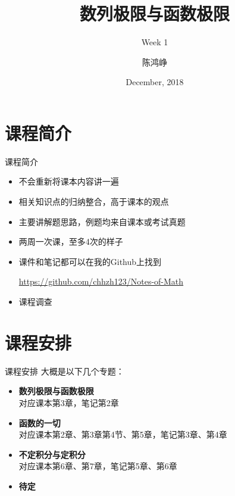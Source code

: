 \documentclass[UTF8]{ctexbeamer}
\title{数列极限与函数极限}
\subtitle{Week 1}
\author[chhzh123]{陈鸿峥}
\institute[]{\small\url{https://github.com/chhzh123/Notes-of-Math/blob/master/Mathematical_analysis/main.pdf}}
\date[Dec 1, 2018]{December, 2018}
\begin{document}
\begin{frame}
\titlepage
\end{frame}

\begin{frame}
\tableofcontents[subsectionstyle=show]
\end{frame}

\section{课程简介}
\begin{frame}
\sectionpage
\end{frame}

\begin{frame}{课程简介}
\begin{itemize}
	\item<1-> 不会重新将课本内容讲一遍
	\item<2-> 相关知识点的归纳整合，高于课本的观点
	\item<3-> 主要讲解题思路，例题均来自课本或考试真题
	\item<4-> 两周一次课，至多4次的样子
	\item<5-> 课件和笔记都可以在我的Github上找到
	\begin{center}
	\url{https://github.com/chhzh123/Notes-of-Math}
	\end{center}
	\item<6> 课程调查
\end{itemize}
\end{frame}

\section{课程安排}
\begin{frame}
\sectionpage
\end{frame}

\begin{frame}{课程安排}
大概是以下几个专题：
\begin{itemize}
	\item \textbf{数列极限与函数极限}\\
	对应课本第3章，笔记第2章
	\item \textbf{函数的一切}\\
	对应课本第2章、第3章第4节、第5章，笔记第3章、第4章
	\item \textbf{不定积分与定积分}\\
	对应课本第6章、第7章，笔记第5章、第6章
	\item \textbf{待定}
\end{itemize}
\end{frame}
\end{document}
